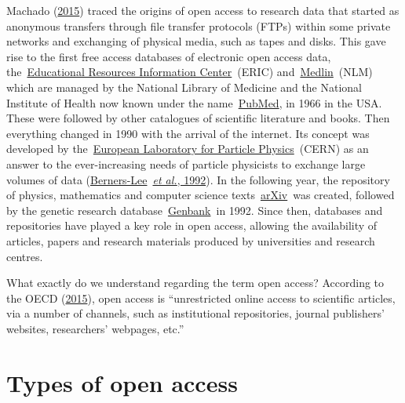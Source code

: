 \documentclass[
]{book}
\begin{document}
Machado (\href{https://goingdigital.oecd.org/data/notes/No13_ToolkitNote_OpenScience.pdf}{2015}) traced the origins of open access to research data that started as anonymous transfers through file transfer protocols (FTPs) within some private networks and exchanging of physical media, such as tapes and disks. This gave rise to the first free access databases of electronic open access data, the~\href{http://www.eric.ed.gov/}{}\href{http://www.eric.ed.gov/}{Educational Resources Information Center}~(ERIC) and~\href{https://www.nlm.nih.gov/}{}\href{https://www.nlm.nih.gov/}{Medlin}~(NLM) which are managed by the National Library of Medicine and the National Institute of Health now known under the name~\href{http://www.pubmed.gov/}{}\href{http://www.pubmed.gov/}{PubMed}, in 1966 in the USA. These were followed by other catalogues of scientific literature and books. Then everything changed in 1990 with the arrival of the internet. Its concept was developed by the~\href{https://home.web.cern.ch/}{}\href{https://home.web.cern.ch/}{European Laboratory for Particle Physics}~(CERN) as an answer to the ever-increasing needs of particle physicists to exchange large volumes of data (\href{https://www.academia.edu/2148655/World_Wide_Web_The_Information_Universe}{Berners-Lee}~\href{https://www.academia.edu/2148655/World_Wide_Web_The_Information_Universe}{\emph{et al.}}\href{https://www.academia.edu/2148655/World_Wide_Web_The_Information_Universe}{, 1992}). In the following year, the repository of physics, mathematics and computer science texts~\href{http://arxiv.org/}{}\href{http://arxiv.org/}{arXiv}~was created, followed by the genetic research database~\href{http://www.ncbi.nlm.nih.gov/genbank}{}\href{http://www.ncbi.nlm.nih.gov/genbank}{Genbank}~in 1992. Since then, databases and repositories have played a key role in open access, allowing the availability of articles, papers and research materials produced by universities and research centres.

What exactly do we understand regarding the term open access? According to the OECD (\href{https://www.oecd-ilibrary.org/science-and-technology/making-open-science-a-reality_5jrs2f963zs1-en}{2015}), open access is ``unrestricted online access to scientific articles, via a number of channels, such as institutional repositories, journal publishers' websites, researchers' webpages, etc.''

\hypertarget{types-of-open-access}{%
\section{\texorpdfstring{\textbf{Types of open access}}{Types of open access}}\label{types-of-open-access}}
\end{document}
